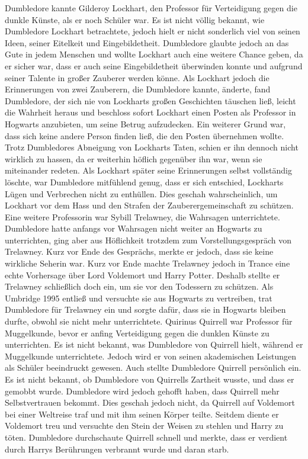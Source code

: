 \documentclass[a4paper, 10pt]{article}
\begin{document}
Dumbledore kannte Gilderoy Lockhart, den Professor für Verteidigung gegen die dunkle Künste, als er noch Schüler war. Es ist nicht völlig bekannt, wie Dumbledore Lockhart betrachtete, jedoch hielt er nicht sonderlich viel von seinen Ideen, seiner Eitelkeit und Eingebildetheit. Dumbledore glaubte jedoch an das Gute in jedem Menschen und wollte Lockhart auch eine weitere Chance geben, da er sicher war, dass er auch seine Eingebildetheit überwinden konnte und aufgrund seiner Talente in großer Zauberer werden könne. Als Lockhart jedoch die Erinnerungen von zwei Zauberern, die Dumbledore kannte, änderte, fand Dumbledore, der sich nie von Lockharts großen Geschichten täuschen ließ, leicht die Wahrheit heraus und beschloss sofort Lockhart einen Posten als Professor in Hogwarts anzubieten, um seine Betrug aufzudecken. Ein weiterer Grund war, dass sich keine andere Person finden ließ, die den Posten übernehmen wollte. Trotz Dumbledores Abneigung von Lockharts Taten, schien er ihn dennoch nicht wirklich zu hassen, da er weiterhin höflich gegenüber ihn war, wenn sie miteinander redeten. Als Lockhart später seine Erinnerungen selbst vollständig löschte, war Dumbledore mitfühlend genug, dass er sich entschied, Lockharts Lügen und Verbrechen nicht zu enthüllen. Dies geschah wahrscheinlich, um Lockhart vor dem Hass und den Strafen der Zauberergemeinschaft zu schützen.
\vspace{10pt}
\newline
{}  
Eine weitere Professorin war Sybill Trelawney, die Wahrsagen unterrichtete. Dumbledore hatte anfangs vor Wahrsagen nicht weiter an Hogwarts zu unterrichten, ging aber aus Höflichkeit trotzdem zum Vorstellungsgespräch von Trelawney. Kurz vor Ende des Gesprächs, merkte er jedoch, dass sie keine wirkliche Seherin war. Kurz vor Ende machte Trelawney jedoch in Trance eine echte Vorhersage über Lord Voldemort und Harry Potter. Deshalb stellte er Trelawney schließlich doch ein, um sie vor den Todessern zu schützen. Als Umbridge 1995 entließ und versuchte sie aus Hogwarts zu vertreiben, trat Dumbledore für Trelawney ein und sorgte dafür, dass sie in Hogwarts bleiben durfte, obwohl sie nicht mehr unterrichtete.
\vspace{10pt}
\newline
{}  
Quirinus Quirrell war Professor für Muggelkunde, bevor er anfing Verteidigung gegen die dunklen Künste zu unterrichten. Es ist nicht bekannt, was Dumbledore von Quirrell hielt, während er Muggelkunde unterrichtete. Jedoch wird er von seinen akademischen Leistungen als Schüler beeindruckt gewesen. Auch stellte Dumbledore Quirrell persönlich ein. Es ist nicht bekannt, ob Dumbledore von Quirrells Zartheit wusste, und dass er gemobbt wurde. Dumbledore wird jedoch gehofft haben, dass Quirrell mehr Selbstvertrauen bekommt. Dies geschah jedoch nicht, da Quirrell auf Voldemort bei einer Weltreise traf und mit ihm seinen Körper teilte. Seitdem diente er Voldemort treu und versuchte den Stein der Weisen zu stehlen und Harry zu töten. Dumbledore durchschaute Quirrell schnell und merkte, dass er verdient durch Harrys Berührungen verbrannt wurde und daran starb.
\end{document}
